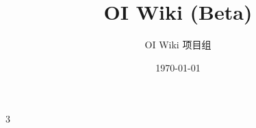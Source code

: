 \documentclass[5pt,a4paper,openany]{extbook}
\title{OI Wiki (Beta)}
\author{OI Wiki 项目组}
\date{\today}
\begin{document}
    \maketitle
    \frontmatter
    \tableofcontents
    \clearpage
    \mainmatter
    \begin{multicols}{3}
    
    \end{multicols}
\end{document}
